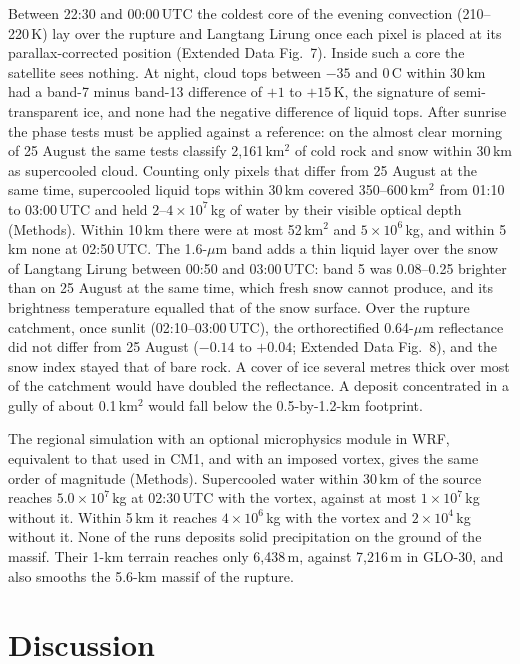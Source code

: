 \documentclass{nature}
\newcommand{\degC}{\,\textdegree C}
\begin{document}
Between 22:30 and 00:00\,UTC the coldest core of the evening convection (210--220\,K) lay over the rupture and Langtang Lirung once each pixel is placed at its parallax-corrected position (Extended Data Fig.~7). Inside such a core the satellite sees nothing. At night, cloud tops between $-35$ and 0\degC{} within 30\,km had a band-7 minus band-13 difference of $+1$ to $+15$\,K, the signature of semi-transparent ice, and none had the negative difference of liquid tops. After sunrise the phase tests must be applied against a reference: on the almost clear morning of 25 August the same tests classify 2,161\,km$^{2}$ of cold rock and snow within 30\,km as supercooled cloud. Counting only pixels that differ from 25 August at the same time, supercooled liquid tops within 30\,km covered 350--600\,km$^{2}$ from 01:10 to 03:00\,UTC and held $2$--$4\times10^{7}$\,kg of water by their visible optical depth (Methods). Within 10\,km there were at most 52\,km$^{2}$ and $5\times10^{6}$\,kg, and within 5\,km none at 02:50\,UTC. The 1.6-$\mu$m band adds a thin liquid layer over the snow of Langtang Lirung between 00:50 and 03:00\,UTC: band 5 was 0.08--0.25 brighter than on 25 August at the same time, which fresh snow cannot produce, and its brightness temperature equalled that of the snow surface. Over the rupture catchment, once sunlit (02:10--03:00\,UTC), the orthorectified 0.64-$\mu$m reflectance did not differ from 25 August ($-0.14$ to $+0.04$; Extended Data Fig.~8), and the snow index stayed that of bare rock. A cover of ice several metres thick over most of the catchment would have doubled the reflectance. A deposit concentrated in a gully of about 0.1\,km$^{2}$ would fall below the 0.5-by-1.2-km footprint.

The regional simulation with an optional microphysics module in WRF, equivalent to that used in CM1, and with an imposed vortex, gives the same order of magnitude (Methods). Supercooled water within 30\,km of the source reaches $5.0\times10^{7}$\,kg at 02:30\,UTC with the vortex, against at most $1\times10^{7}$\,kg without it. Within 5\,km it reaches $4\times10^{6}$\,kg with the vortex and $2\times10^{4}$\,kg without it. None of the runs deposits solid precipitation on the ground of the massif. Their 1-km terrain reaches only 6,438\,m, against 7,216\,m in GLO-30, and also smooths the 5.6-km massif of the rupture.

\section*{Discussion}
\end{document}
